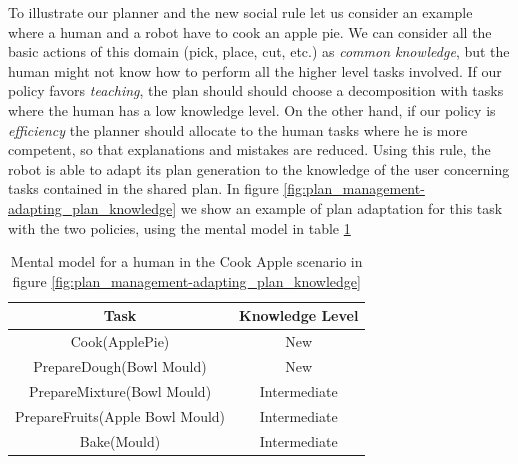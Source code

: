 To illustrate our planner and the new social rule let us consider an example where a human and a robot have to cook an apple pie. We can consider all the basic actions of this domain (pick, place, cut, etc.) as \textit{common knowledge}, but the human might not know how to perform all the higher level tasks involved. If our policy favors \textit{teaching}, 
the plan should should choose a decomposition with tasks where the human has a low knowledge level. On the other hand, if our policy is \textit{efficiency} the planner should allocate to the human tasks where he is more competent, so that explanations and mistakes are reduced. Using this rule, the robot is able to adapt its plan generation to the knowledge of the user concerning tasks contained in the shared plan. In figure \ref{fig:plan_management-adapting_plan_knowledge} we show an example of plan adaptation for this task with the two policies, using the mental model in table \ref{table:plan_management-apple_pie_human_knowledge}

 
 \begin{table}
\centering
\scriptsize
\renewcommand{\arraystretch}{1.3}
\begin{tabular}{|c|c|}
\hline
Task & Knowledge Level \\ \hline \hline
Cook(ApplePie) & New \\ \hline
PrepareDough(Bowl Mould) & New \\ \hline
PrepareMixture(Bowl Mould) & Intermediate \\ \hline
PrepareFruits(Apple Bowl Mould) & Intermediate \\ \hline
Bake(Mould) & Intermediate \\ 
\hline
\end{tabular}
\caption[Mental model for a human in the Cook Apple
 scenario.]{Mental model for a human in the Cook Apple
 scenario in figure \ref{fig:plan_management-adapting_plan_knowledge} }
 \label{table:plan_management-apple_pie_human_knowledge}    
\end{table}



